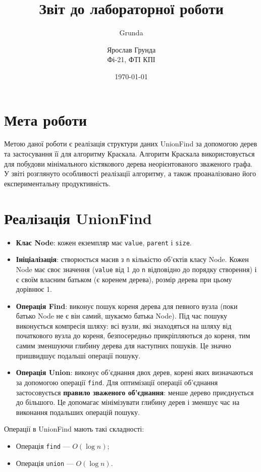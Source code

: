 \documentclass{article}
\author{Grunda}
\title{Звіт до лабораторної роботи}
\author{Ярослав Грунда \\ Фі-21, ФТІ КПІ}
\date{\today}
\begin{document}
\maketitle

\tableofcontents  
\newpage

\section{Мета роботи}

Метою даної роботи є реалізація структури даних UnionFind за допомогою дерев та застосування її для алгоритму Краскала. 
Алгоритм Краскала використовується для побудови мінімального кістякового дерева неорієнтованого зваженого графа. 
У звіті розглянуто особливості реалізації алгоритму, а також проаналізовано його експериментальну продуктивність.

\section{Реалізація UnionFind}

\begin{itemize}
    \item \textbf{Клас Node}: кожен екземпляр має \texttt{value}, \texttt{parent} і \texttt{size}. 
    \item \textbf{Ініціалізація}: створюється масив з \texttt{n} кількістю об'єктів класу Node. Кожен Node має своє значення (\texttt{value} від 1 до \texttt{n} 
    відповідно до порядку створення) і є своїм власним батьком (є коренем дерева), розмір дерева при цьому дорівнює 1.
    \item \textbf{Операція Find}: виконує пошук кореня дерева для певного вузла (поки батько Node не є він самий, шукаємо батька Node). 
    Під час пошуку виконується компресія шляху: всі вузли, які знаходяться на шляху від початкового вузла до кореня, безпосередньо прикріпляються до кореня,
    тим самим зменшуючи глибину дерева для наступних пошуків. Це значно пришвидшує подальші операції пошуку.
    \item \textbf{Операція Union}: виконує об'єднання двох дерев, корені яких визначаються за допомогою операції \texttt{find}.
    Для оптимізації операції об'єднання застосовується \textbf{правило зваженого об'єднання}: менше дерево приєднується до більшого. 
    Це допомагає мінімізувати глибину дерев і зменшує час на виконання подальших операцій пошуку.
\end{itemize}

Операції в UnionFind мають такі складності:
\begin{itemize}
    \item Операція \texttt{find} — $O(\log n)$;
    \item Операція \texttt{union} — $O(\log n)$.
\end{itemize}
\end{document}
